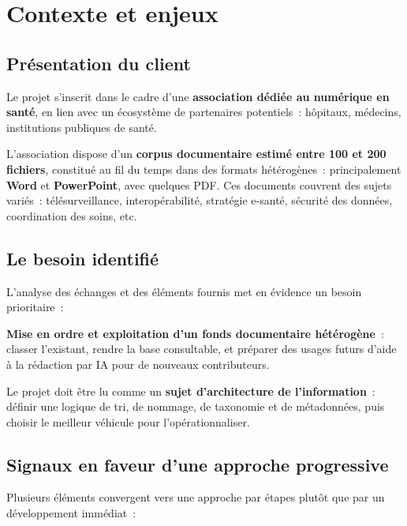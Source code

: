 \documentclass[12pt, a4paper]{article}
\begin{document}
\section{Contexte et enjeux}

\subsection{Présentation du client}

Le projet s'inscrit dans le cadre d'une \textbf{association dédiée au numérique en santé}, en lien avec un écosystème de partenaires potentiels~: hôpitaux, médecins, institutions publiques de santé.

L'association dispose d'un \textbf{corpus documentaire estimé entre 100 et 200 fichiers}, constitué au fil du temps dans des formats hétérogènes~: principalement \textbf{Word} et \textbf{PowerPoint}, avec quelques PDF. Ces documents couvrent des sujets variés~: télésurveillance, interopérabilité, stratégie e-santé, sécurité des données, coordination des soins, etc.

\subsection{Le besoin identifié}

L'analyse des échanges et des éléments fournis met en évidence un besoin prioritaire~:

\begin{keybox}
\textbf{Mise en ordre et exploitation d'un fonds documentaire hétérogène}~: classer l'existant, rendre la base consultable, et préparer des usages futurs d'aide à la rédaction par IA pour de nouveaux contributeurs.
\end{keybox}

Le projet doit être lu comme un \textbf{sujet d'architecture de l'information}~: définir une logique de tri, de nommage, de taxonomie et de métadonnées, puis choisir le meilleur véhicule pour l'opérationnaliser.

\subsection{Signaux en faveur d'une approche progressive}

Plusieurs éléments convergent vers une approche par étapes plutôt que par un développement immédiat~:
\end{document}
